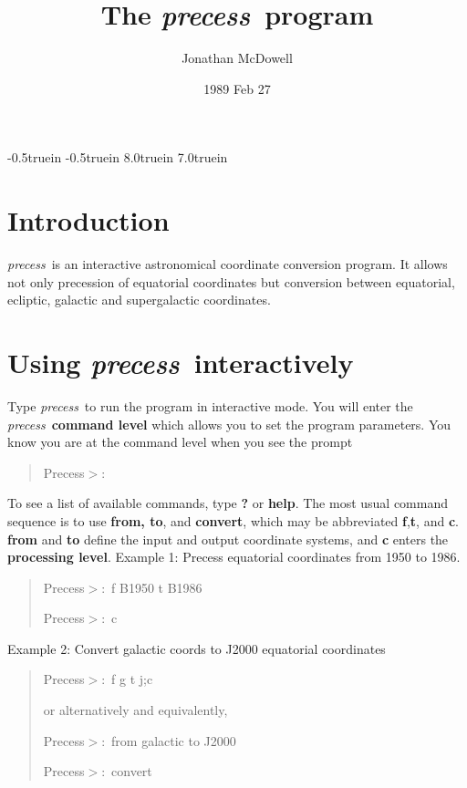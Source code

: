 \hoffset -0.5truein
\voffset -0.5truein
\textheight 8.0truein
\textwidth  7.0truein
\newcommand{\pr}{{\it precess}~}
\newcommand{\prompt}{Precess$>$:~}


\title {The \pr program}

\author{Jonathan McDowell}

\date{1989 Feb 27}


\maketitle




\section{Introduction}

\pr is an interactive astronomical coordinate conversion
program. It allows not only precession of equatorial coordinates
but conversion between equatorial, ecliptic, galactic and supergalactic
coordinates.

\section{ Using \pr interactively}

Type \pr to run the program in interactive mode.
You will enter the \pr {\bf command level} which allows you to set the
program parameters. You know you are at the command level when you see the
prompt
\begin{quote}
\prompt
\end{quote}

To see a list of available commands, type {\bf ?} or {\bf help}. The most
usual command sequence is to use {\bf from, to}, and {\bf convert},
 which may be abbreviated
{\bf f},{\bf t}, and {\bf c}. {\bf from} and {\bf to} 
define the input and output coordinate systems,
and {\bf c} enters the {\bf processing level}. 
Example 1: Precess equatorial coordinates from 1950 to 1986. \begin{quote}
\prompt f B1950 t B1986

\prompt c \end{quote}

Example 2: Convert galactic coords to J2000 equatorial coordinates \begin{quote}
\prompt f g t j;c

or alternatively and equivalently,

\prompt from galactic to J2000

\prompt convert \end{quote}


